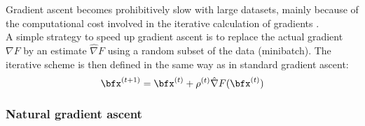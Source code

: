 Gradient ascent becomes prohibitively slow with large datasets, mainly because of the computational cost involved in the iterative calculation of gradients \cite{Spall2003}.\\
A simple strategy to speed up gradient ascent is to replace the actual gradient $\nabla F$ by an estimate $\hat{\nabla} F$ using a random subset of the data (minibatch).
The iterative scheme is then defined in the same way as in standard gradient ascent:
\begin{equation}
	\bfx^{(t+1)} = \bfx^{(t)} + \rho^{(t)} \hat{\nabla} F(\bfx^{(t)})
\end{equation}




\subsubsection{Natural gradient ascent} \label{section:natural_gradient_ascent}

